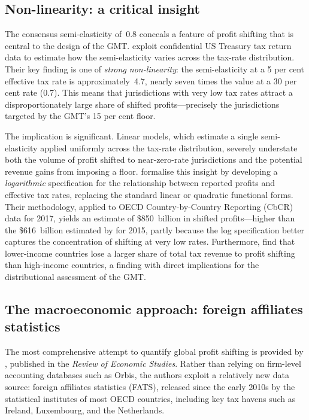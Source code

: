 \documentclass[12pt,a4paper]{article}
\begin{document}
\subsection{Non-linearity: a critical insight}

The consensus semi-elasticity of~0.8 conceals a feature of profit shifting that is central to the design of the GMT.
\textcite{dowd2017} exploit confidential US Treasury tax return data to estimate how the semi-elasticity varies across the tax-rate distribution.
Their key finding is one of \emph{strong non-linearity}: the semi-elasticity at a 5 per cent effective tax rate is approximately~4.7, nearly seven times the value at a 30 per cent rate (0.7).
This means that jurisdictions with very low tax rates attract a disproportionately large share of shifted profits---precisely the jurisdictions targeted by the GMT's 15 per cent floor.

The implication is significant.
Linear models, which estimate a single semi-elasticity applied uniformly across the tax-rate distribution, severely understate both the volume of profit shifted to near-zero-rate jurisdictions and the potential revenue gains from imposing a floor.
\textcite{garcia2024} formalise this insight by developing a \emph{logarithmic} specification for the relationship between reported profits and effective tax rates, replacing the standard linear or quadratic functional forms.
Their methodology, applied to OECD Country-by-Country Reporting (CbCR) data for 2017, yields an estimate of \$850~billion in shifted profits---higher than the \$616~billion estimated by \textcite{torslov2022} for 2015, partly because the log specification better captures the concentration of shifting at very low rates.
Furthermore, \textcite{garcia2024} find that lower-income countries lose a larger share of total tax revenue to profit shifting than high-income countries, a finding with direct implications for the distributional assessment of the GMT.

\subsection{The macroeconomic approach: foreign affiliates statistics}

The most comprehensive attempt to quantify global profit shifting is provided by \textcite{torslov2022}, published in the \emph{Review of Economic Studies}.
Rather than relying on firm-level accounting databases such as Orbis, the authors exploit a relatively new data source: foreign affiliates statistics (FATS), released since the early 2010s by the statistical institutes of most OECD countries, including key tax havens such as Ireland, Luxembourg, and the Netherlands.
\end{document}
